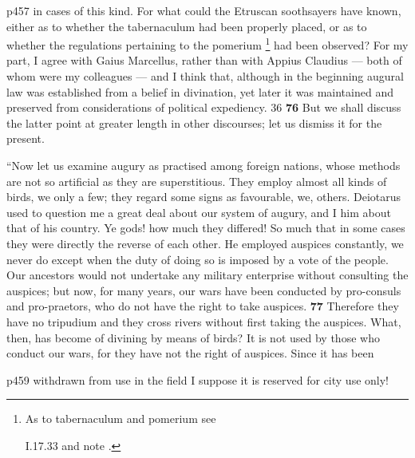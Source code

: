 p457 in cases of this kind. For what could the Etruscan soothsayers have known, either as to whether the tabernaculum had been properly placed, or as to whether the regulations pertaining to the pomerium \texthebrew{}\footnote{As to tabernaculum and pomerium see

I.17.33 and note .

} had been observed? For my part, I agree with Gaius Marcellus, rather than with Appius Claudius \texthebrew{—} both of whom were my colleagues \texthebrew{—} and I think that, although in the beginning augural law was established from a belief in divination, yet later it was maintained and preserved from considerations of political expediency. 36 \textbf{76} But we shall discuss the latter point at greater length in other discourses; let us dismiss it for the present.

``Now let us examine augury as practised among foreign nations, whose methods are not so artificial as they are superstitious. They employ almost all kinds of birds, we only a few; they regard some signs as favourable, we, others. Deiotarus used to question me a great deal about our system of augury, and I him about that of his country. Ye gods! how much they differed! So much that in some cases they were directly the reverse of each other. He employed auspices constantly, we never do except when the duty of doing so is imposed by a vote of the people. Our ancestors would not undertake any military enterprise without consulting the auspices; but now, for many years, our wars have been conducted by pro-consuls and pro-praetors, who do not have the right to take auspices. \textbf{77} Therefore they have no tripudium and they cross rivers without first taking the auspices. What, then, has become of divining by means of birds? It is not used by those who conduct our wars, for they have not the right of auspices. Since it has been

p459 withdrawn from use in the field I suppose it is reserved for city use only!

